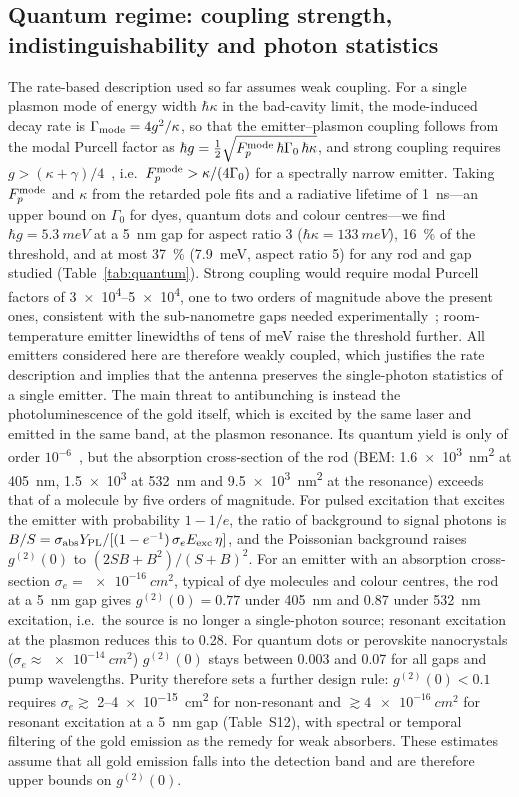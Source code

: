 \documentclass[11pt,a4paper]{article}
\newcommand{\Fp}{F_p}
\begin{document}
\subsection{Quantum regime: coupling strength, indistinguishability and photon statistics}
The rate-based description used so far assumes weak coupling. For a single plasmon mode of energy width
$\hbar\kappa$ in the bad-cavity limit, the mode-induced decay rate is $\Gamma_{\rm mode}=4g^2/\kappa$, so that the
emitter--plasmon coupling follows from the modal Purcell factor as
$\hbar g=\tfrac12\sqrt{\Fp^{\rm mode}\,\hbar\Gamma_0\,\hbar\kappa}$, and strong coupling requires
$g>(\kappa+\gamma)/4$~\cite{torma2015}, i.e.\ $\Fp^{\rm mode}>\kappa/(4\Gamma_0)$ for a spectrally narrow emitter.
Taking $\Fp^{\rm mode}$ and $\kappa$ from the retarded pole fits and a radiative lifetime of \SI{1}{ns}---an upper
bound on $\Gamma_0$ for dyes, quantum dots and colour centres---we find $\hbar g=\SI{5.3}{meV}$ at a \SI{5}{nm} gap
for aspect ratio 3 ($\hbar\kappa=\SI{133}{meV}$), \SI{16}{\percent} of the threshold, and at most \SI{37}{\percent}
(\SI{7.9}{meV}, aspect ratio 5) for any rod and gap studied (Table~\ref{tab:quantum}). Strong coupling would require
modal Purcell factors of \numrange{3e4}{5e4}, one to two orders of magnitude above the present ones, consistent with
the sub-nanometre gaps needed experimentally~\cite{chikkaraddy2016}; room-temperature emitter linewidths of tens of
meV raise the threshold further. All emitters considered here are therefore weakly coupled, which justifies the rate
description and implies that the antenna preserves the single-photon statistics of a single emitter. The main
threat to antibunching is instead the photoluminescence of the gold itself, which is excited by the same laser and
emitted in the same band, at the plasmon resonance. Its quantum yield is only of order
$10^{-6}$~\cite{yorulmaz2012}, but the absorption cross-section of the rod (BEM: \SI{1.6e3}{nm^2} at
\SI{405}{nm}, \num{1.5e3} at \SI{532}{nm} and \SI{9.5e3}{nm^2} at the resonance) exceeds that of a molecule by five
orders of magnitude. For pulsed excitation that excites the emitter with probability $1-1/e$, the ratio of background
to signal photons is $B/S=\sigma_{\rm abs}Y_{\rm PL}/[(1-e^{-1})\,\sigma_eE_{\rm exc}\,\eta]$, and the Poissonian
background raises $g^{(2)}(0)$ to $(2SB+B^2)/(S+B)^2$. For an emitter with an absorption cross-section
$\sigma_e=\SI{e-16}{cm^2}$, typical of dye molecules and colour centres, the rod at a \SI{5}{nm} gap gives
$g^{(2)}(0)=0.77$ under \SI{405}{nm} and 0.87 under \SI{532}{nm} excitation, i.e.\ the source is no longer a
single-photon source; resonant excitation at the plasmon reduces this to 0.28. For quantum dots or perovskite
nanocrystals ($\sigma_e\approx\SI{e-14}{cm^2}$) $g^{(2)}(0)$ stays between 0.003 and 0.07 for all gaps and pump wavelengths.
Purity therefore sets a further design rule: $g^{(2)}(0)<0.1$ requires $\sigma_e\gtrsim$ 2--\SI{4e-15}{cm^2} for
non-resonant and $\gtrsim\SI{4e-16}{cm^2}$ for resonant excitation at a \SI{5}{nm} gap (Table~S12), with spectral or
temporal filtering of the gold emission as the remedy for weak absorbers. These estimates assume that all gold
emission falls into the detection band and are therefore upper bounds on $g^{(2)}(0)$.
\end{document}
